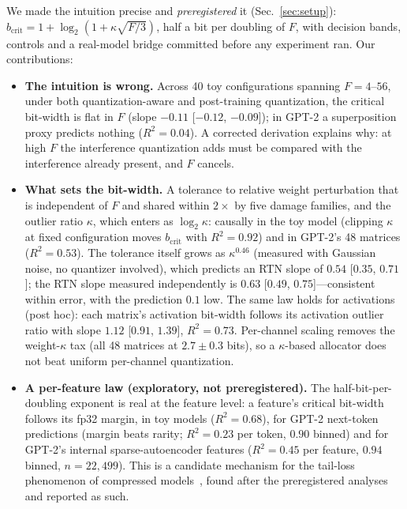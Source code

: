 \documentclass{article}
\begin{document}
We made the intuition precise and \emph{preregistered} it (Sec.~\ref{sec:setup}): $b_{\mathrm{crit}} = 1 +
\log_2(1+\kappa\sqrt{F/3})$, half a bit per doubling of $F$, with decision bands, controls and a real-model bridge committed
before any experiment ran. Our contributions:
\begin{itemize}\setlength\itemsep{1pt}
\item \textbf{The intuition is wrong.} Across 40 toy configurations spanning $F = 4$--$56$, under both
quantization-aware and post-training quantization, the critical bit-width is flat in $F$ (slope $-0.11$
[$-0.12$, $-0.09$]); in GPT-2 a superposition proxy predicts nothing ($R^2=0.04$). A corrected derivation explains why:
at high $F$ the interference quantization adds must be compared with the interference already present, and $F$ cancels.
\item \textbf{What sets the bit-width.} A tolerance to relative weight perturbation that is independent of $F$ and
shared within $2\times$ by five damage families, and the outlier ratio $\kappa$, which enters as $\log_2\kappa$: causally
in the toy model (clipping $\kappa$ at fixed configuration moves $b_{\mathrm{crit}}$ with $R^2=0.92$) and in GPT-2's 48
matrices ($R^2=0.53$). The tolerance itself grows as $\kappa^{0.46}$ (measured with Gaussian noise, no quantizer involved), which predicts an
RTN slope of $0.54$ [$0.35$, $0.71$]; the RTN slope measured independently is $0.63$ [$0.49$, $0.75$]---consistent within
error, with the prediction $0.1$ low. The same law holds for
activations (post hoc): each matrix's activation bit-width follows its activation outlier ratio with slope $1.12$
[$0.91$, $1.39$], $R^2=0.73$. Per-channel scaling removes the weight-$\kappa$ tax (all 48 matrices at $2.7\pm0.3$ bits), so
a $\kappa$-based allocator does not beat uniform per-channel quantization.
\item \textbf{A per-feature law (exploratory, not preregistered).} The half-bit-per-doubling exponent is real at the
feature level: a feature's critical bit-width follows its fp32 margin, in toy models ($R^2=0.68$), for GPT-2 next-token
predictions (margin beats rarity; $R^2=0.23$ per token, $0.90$ binned) and for GPT-2's internal sparse-autoencoder
features ($R^2=0.45$ per feature, $0.94$ binned, $n=22{,}499$). This is a candidate mechanism for the tail-loss
phenomenon of compressed models~\cite{hooker2019,hooker2020}, found after the preregistered analyses and reported as such.
\end{itemize}
\end{document}
